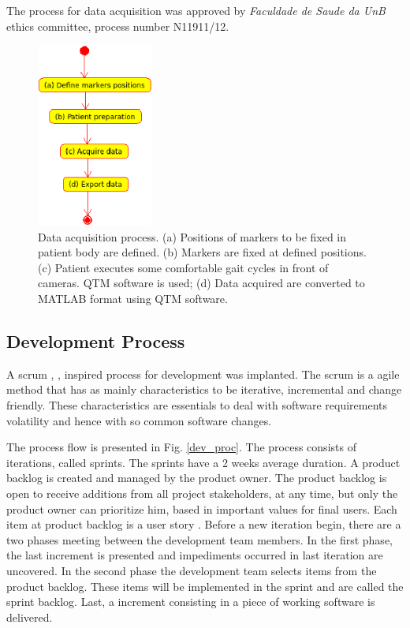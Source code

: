 \documentclass[journal]{IEEEtran}
\begin{document}
The process for data acquisition was approved by 
\emph{Faculdade de Saude da UnB} ethics committee, 
process number N11911/12.

\begin{figure}[!t]
	\centering
	\includegraphics[width=1.5in]{./data_acq_proc.eps}
	\caption{Data acquisition process.
		(a) Positions of markers to be fixed in patient body are defined.
		(b) Markers are fixed at defined positions.
		(c) Patient executes some comfortable gait cycles in front of cameras.
		QTM software is used;
		(d) Data acquired are converted to MATLAB format using QTM software.
	}
	\label{data_acq_proc}
\end{figure}


\subsection{Development Process}

A scrum \cite{Schwaber2001}, \cite{Schwaber2004}, \cite{Rubin2012} inspired process for development was implanted.
The scrum is a agile method \cite{Beck2001} that has as mainly characteristics
to be iterative, incremental and change friendly.
These characteristics are essentials to deal with software requirements volatility
and hence with so common software changes.

The process flow is presented in Fig. \ref{dev_proc}.
The process consists of iterations, called sprints.
The sprints have a 2 weeks average duration.
A product backlog is created and managed by the product owner.
The product backlog is open to receive additions from all 
project stakeholders, at any time, but only the product owner can prioritize him,
based in important values for final users.
Each item at product backlog is a user story \cite{cohn2004}.
Before a new iteration begin, there are a two phases meeting between the development team members. 
In the first phase, the last increment is presented and impediments occurred in last iteration are uncovered.
In the second phase the development team selects items from the product backlog.
These items will be implemented in the sprint and are called the sprint backlog.
Last, a increment consisting in a piece of working software is delivered.
\end{document}
